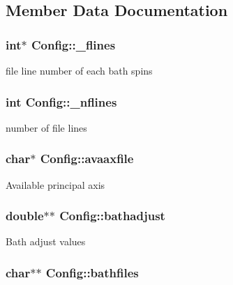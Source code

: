 \subsection{Member Data Documentation}
\hypertarget{structConfig_a20fb9e36c4c73d0890445628232c5636}{
\subsubsection[{\-\_\-flines}]{\setlength{\rightskip}{0pt plus 5cm}int$\ast$ Config\-::\-\_\-flines}}\label{structConfig_a20fb9e36c4c73d0890445628232c5636}
file line number of each bath spins \hypertarget{structConfig_aae1991f77e6f99acc5342c1944b46736}{
\subsubsection[{\-\_\-nflines}]{\setlength{\rightskip}{0pt plus 5cm}int Config\-::\-\_\-nflines}}\label{structConfig_aae1991f77e6f99acc5342c1944b46736}
number of file lines \hypertarget{structConfig_ae3244e507716ae5483bb32a2e4fef809}{
\subsubsection[{avaaxfile}]{\setlength{\rightskip}{0pt plus 5cm}char$\ast$ Config\-::avaaxfile}}\label{structConfig_ae3244e507716ae5483bb32a2e4fef809}
Available principal axis \hypertarget{structConfig_a1ce641fcaac86656dde150e974ff5ff7}{
\subsubsection[{bathadjust}]{\setlength{\rightskip}{0pt plus 5cm}double$\ast$$\ast$ Config\-::bathadjust}}\label{structConfig_a1ce641fcaac86656dde150e974ff5ff7}
Bath adjust values \hypertarget{structConfig_afe80a72359e5fc90a5f0f16e9f1d357e}{
\subsubsection[{bathfiles}]{\setlength{\rightskip}{0pt plus 5cm}char$\ast$$\ast$ Config\-::bathfiles}}\label{structConfig_afe80a72359e5fc90a5f0f16e9f1d357e}
